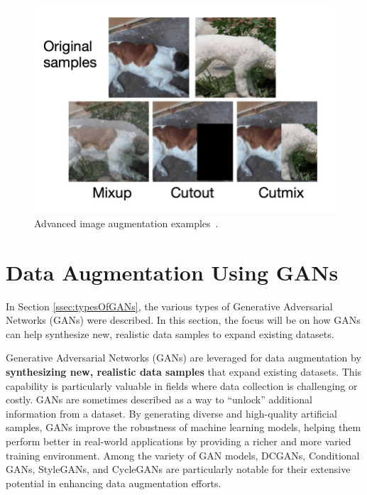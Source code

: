 \begin{figure}[!htb]
    \centering
    \includegraphics[scale=0.4]{Images/advanced-augmentation-methods.jpg}
    \caption{Advanced image augmentation examples~\cite{AdvAugExamples}.}
    \label{fig:advAugExamples}
\end{figure}

\section{Data Augmentation Using GANs}
\label{ssec:augmentationGANs}

In Section \ref{ssec:typesOfGANs}, the various types of Generative Adversarial Networks (GANs) were described. In this section, the focus will be on how GANs can help synthesize new, realistic data samples to expand existing datasets.

Generative Adversarial Networks (GANs) are leveraged for data augmentation by \textbf{synthesizing new, realistic data samples} that expand existing datasets. This capability is particularly valuable in fields where data collection is challenging or costly. GANs are sometimes described as a way to “unlock” additional information from a dataset. By generating diverse and high-quality artificial samples, GANs improve the robustness of machine learning models, helping them perform better in real-world applications by providing a richer and more varied training environment. Among the variety of GAN models, DCGANs, Conditional GANs, StyleGANs, and CycleGANs are particularly notable for their extensive potential in enhancing data augmentation efforts. 

